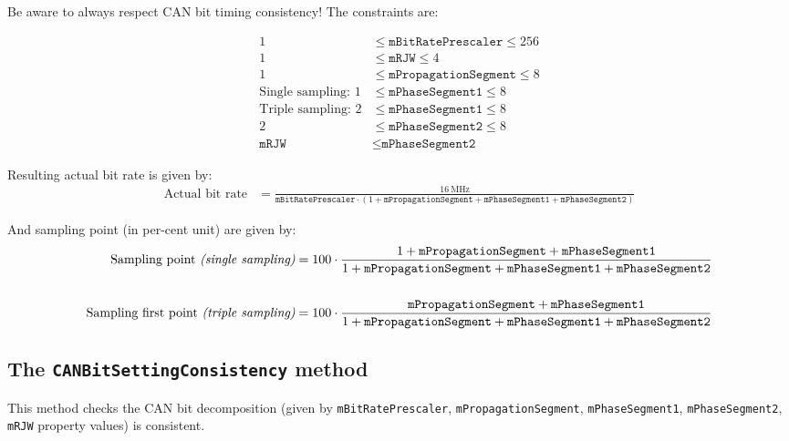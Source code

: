 \documentclass[9pt, a4paper, obeyspaces, openany]{extarticle}
\newcommand \subsectionLabel[2]{\subsection{#1}\label{subsec:#2}}
\begin{document}
Be aware to always respect CAN bit timing consistency! The constraints are:

\begin{align*}
1 & \leqslant \texttt{mBitRatePrescaler} \leqslant 256 \\
1 & \leqslant \texttt{mRJW} \leqslant 4 \\
1 & \leqslant \texttt{mPropagationSegment} \leqslant 8 \\
\text{Single sampling: }1 & \leqslant \texttt{mPhaseSegment1} \leqslant 8\\
\text{Triple sampling: }2 & \leqslant \texttt{mPhaseSegment1} \leqslant 8\\
2 & \leqslant \texttt{mPhaseSegment2} \leqslant 8 \\
\texttt{mRJW} &\leqslant \texttt{mPhaseSegment2}
\end{align*}

Resulting actual bit rate is given by:
{\small
\begin{align*}
\text{Actual bit rate} & = \frac{16~\text{MHz}}{\texttt{mBitRatePrescaler} \cdot (1 + \texttt{mPropagationSegment} + \texttt{mPhaseSegment1} + \texttt{mPhaseSegment2})}
\end{align*}
}

And sampling point (in per-cent unit) are given by:
{\small
\begin{align*}
\text{Sampling point {\it(single sampling)}} & = 100 \cdot \frac{1 + \texttt{mPropagationSegment} + \texttt{mPhaseSegment1}}{1 + \texttt{mPropagationSegment} + \texttt{mPhaseSegment1} + \texttt{mPhaseSegment2}}  \\
  & \\
\text{Sampling first point {\it(triple sampling)}} & = 100 \cdot \frac{\texttt{mPropagationSegment} + \texttt{mPhaseSegment1}}{1 + \texttt{mPropagationSegment} + \texttt{mPhaseSegment1} + \texttt{mPhaseSegment2}}
\end{align*}
}












\subsectionLabel{The \texttt{CANBitSettingConsistency} method}{CANBitSettingConsistency}

This method checks the CAN bit decomposition (given by \texttt{mBitRatePrescaler}, \texttt{mPropagationSegment}, \texttt{mPhaseSegment1}, \texttt{mPhaseSegment2}, \texttt{mRJW} property values) is consistent.
\end{document}
